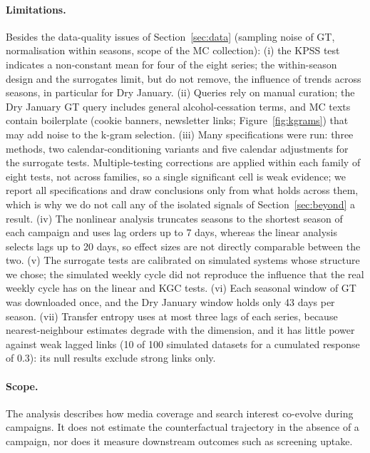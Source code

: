 \documentclass[11pt,a4paper]{article}
\begin{document}
\paragraph{Limitations.} Besides the data-quality issues of Section~\ref{sec:data} (sampling noise of GT, normalisation within seasons, scope of the MC collection): (i) the KPSS test indicates a non-constant mean for four of the eight series; the within-season design and the surrogates limit, but do not remove, the influence of trends across seasons, in particular for Dry January. (ii) Queries rely on manual curation; the Dry January GT query includes general alcohol-cessation terms, and MC texts contain boilerplate (cookie banners, newsletter links; Figure~\ref{fig:kgrams}) that may add noise to the k-gram selection. (iii) Many specifications were run: three methods, two calendar-conditioning variants and five calendar adjustments for the surrogate tests. Multiple-testing corrections are applied within each family of eight tests, not across families, so a single significant cell is weak evidence; we report all specifications and draw conclusions only from what holds across them, which is why we do not call any of the isolated signals of Section~\ref{sec:beyond} a result. (iv) The nonlinear analysis truncates seasons to the shortest season of each campaign and uses lag orders up to 7 days, whereas the linear analysis selects lags up to 20 days, so effect sizes are not directly comparable between the two. (v) The surrogate tests are calibrated on simulated systems whose structure we chose; the simulated weekly cycle did not reproduce the influence that the real weekly cycle has on the linear and KGC tests. (vi) Each seasonal window of GT was downloaded once, and the Dry January window holds only 43 days per season. (vii) Transfer entropy uses at most three lags of each series, because nearest-neighbour estimates degrade with the dimension, and it has little power against weak lagged links (10 of 100 simulated datasets for a cumulated response of 0.3): its null results exclude strong links only.

\paragraph{Scope.} The analysis describes how media coverage and search interest co-evolve during campaigns. It does not estimate the counterfactual trajectory in the absence of a campaign, nor does it measure downstream outcomes such as screening uptake.

\end{document}

